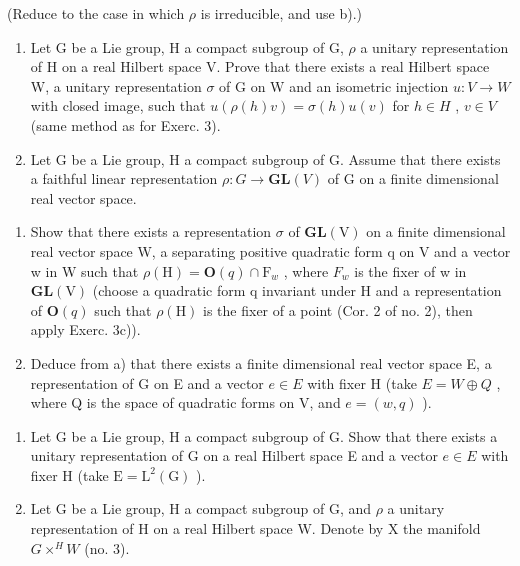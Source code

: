 \begin{enumerate}
(Reduce to the case in which \(\rho\) is irreducible, and use b).)

\begin{enumerate}
\def\labelenumi{\arabic{enumi})}
\setcounter{enumi}{3}
\item
  Let G be a Lie group, H a compact subgroup of G, \(\rho\) a unitary representation of H on a real Hilbert space V. Prove that there exists a real Hilbert space W, a unitary representation \(\sigma\) of G on W and an isometric injection \(u: V \to W\) with closed image, such that \(u(\rho(h)v) = \sigma(h)u(v)\) for \(h \in H\) , \(v \in V\) (same method as for Exerc. 3).
\item
  Let G be a Lie group, H a compact subgroup of G. Assume that there exists a faithful linear representation \(\rho: G \to \mathbf{GL}(V)\) of G on a finite dimensional real vector space.
\end{enumerate}

\begin{enumerate}
\def\labelenumi{\alph{enumi})}
\item
  Show that there exists a representation \(\sigma\) of \(\mathbf{GL}(\mathrm{V})\) on a finite dimensional real vector space W, a separating positive quadratic form q on V and a vector w in W such that \(\rho(\mathrm{H}) = \mathbf{O}(q) \cap \mathrm{F}_{w}\) , where \(F_{w}\) is the fixer of w in \(\mathbf{GL}(\mathrm{V})\) (choose a quadratic form q invariant under H and a representation of \(\mathbf{O}(q)\) such that \(\rho(\mathrm{H})\) is the fixer of a point (Cor. 2 of no. 2), then apply Exerc. 3c)).
\item
  Deduce from a) that there exists a finite dimensional real vector space E, a representation of G on E and a vector \(e \in E\) with fixer H (take \(E = W \oplus Q\) , where Q is the space of quadratic forms on V, and \(e = (w, q)\) ).
\end{enumerate}

\begin{enumerate}
\def\labelenumi{\arabic{enumi})}
\setcounter{enumi}{5}
\item
  Let G be a Lie group, H a compact subgroup of G. Show that there exists a unitary representation of G on a real Hilbert space E and a vector \(e \in E\) with fixer H (take \(\mathrm{E} = \mathrm{L}^{2}(\mathrm{G})\) ).
\item
  Let G be a Lie group, H a compact subgroup of G, and \(\rho\) a unitary representation of H on a real Hilbert space W. Denote by X the manifold \(G \times ^{H}W\) (no. 3).
\end{enumerate}


\end{enumerate}
